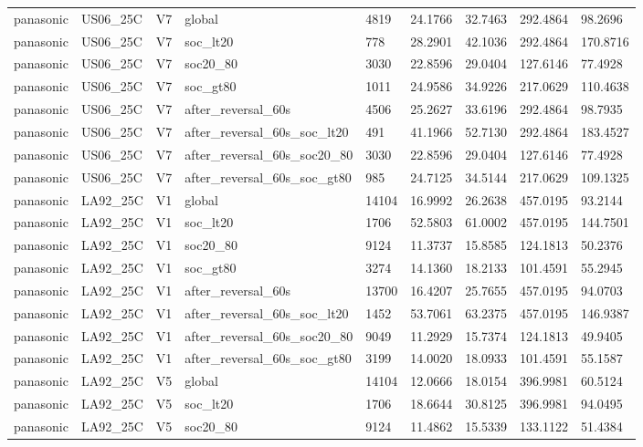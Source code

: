 \begin{tabular}{lllllllll}
panasonic & US06\_25C & V7 & global & 4819 & 24.1766 & 32.7463 & 292.4864 & 98.2696 \\
panasonic & US06\_25C & V7 & soc\_lt20 & 778 & 28.2901 & 42.1036 & 292.4864 & 170.8716 \\
panasonic & US06\_25C & V7 & soc20\_80 & 3030 & 22.8596 & 29.0404 & 127.6146 & 77.4928 \\
panasonic & US06\_25C & V7 & soc\_gt80 & 1011 & 24.9586 & 34.9226 & 217.0629 & 110.4638 \\
panasonic & US06\_25C & V7 & after\_reversal\_60s & 4506 & 25.2627 & 33.6196 & 292.4864 & 98.7935 \\
panasonic & US06\_25C & V7 & after\_reversal\_60s\_soc\_lt20 & 491 & 41.1966 & 52.7130 & 292.4864 & 183.4527 \\
panasonic & US06\_25C & V7 & after\_reversal\_60s\_soc20\_80 & 3030 & 22.8596 & 29.0404 & 127.6146 & 77.4928 \\
panasonic & US06\_25C & V7 & after\_reversal\_60s\_soc\_gt80 & 985 & 24.7125 & 34.5144 & 217.0629 & 109.1325 \\
panasonic & LA92\_25C & V1 & global & 14104 & 16.9992 & 26.2638 & 457.0195 & 93.2144 \\
panasonic & LA92\_25C & V1 & soc\_lt20 & 1706 & 52.5803 & 61.0002 & 457.0195 & 144.7501 \\
panasonic & LA92\_25C & V1 & soc20\_80 & 9124 & 11.3737 & 15.8585 & 124.1813 & 50.2376 \\
panasonic & LA92\_25C & V1 & soc\_gt80 & 3274 & 14.1360 & 18.2133 & 101.4591 & 55.2945 \\
panasonic & LA92\_25C & V1 & after\_reversal\_60s & 13700 & 16.4207 & 25.7655 & 457.0195 & 94.0703 \\
panasonic & LA92\_25C & V1 & after\_reversal\_60s\_soc\_lt20 & 1452 & 53.7061 & 63.2375 & 457.0195 & 146.9387 \\
panasonic & LA92\_25C & V1 & after\_reversal\_60s\_soc20\_80 & 9049 & 11.2929 & 15.7374 & 124.1813 & 49.9405 \\
panasonic & LA92\_25C & V1 & after\_reversal\_60s\_soc\_gt80 & 3199 & 14.0020 & 18.0933 & 101.4591 & 55.1587 \\
panasonic & LA92\_25C & V5 & global & 14104 & 12.0666 & 18.0154 & 396.9981 & 60.5124 \\
panasonic & LA92\_25C & V5 & soc\_lt20 & 1706 & 18.6644 & 30.8125 & 396.9981 & 94.0495 \\
panasonic & LA92\_25C & V5 & soc20\_80 & 9124 & 11.4862 & 15.5339 & 133.1122 & 51.4384 \\

\end{tabular}
